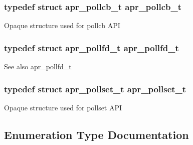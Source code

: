 \subsubsection[{\texorpdfstring{apr\+\_\+pollcb\+\_\+t}{apr_pollcb_t}}]{\setlength{\rightskip}{0pt plus 5cm}typedef struct {\bf apr\+\_\+pollcb\+\_\+t} {\bf apr\+\_\+pollcb\+\_\+t}}\hypertarget{group__apr__poll_gae382e39bdf0c5a02fca7da3944bece08}{}\label{group__apr__poll_gae382e39bdf0c5a02fca7da3944bece08}
Opaque structure used for pollcb A\+PI 
\subsubsection[{\texorpdfstring{apr\+\_\+pollfd\+\_\+t}{apr_pollfd_t}}]{\setlength{\rightskip}{0pt plus 5cm}typedef struct {\bf apr\+\_\+pollfd\+\_\+t} {\bf apr\+\_\+pollfd\+\_\+t}}\hypertarget{group__apr__poll_ga0c89b184cbe2337e44207f1ad245129b}{}\label{group__apr__poll_ga0c89b184cbe2337e44207f1ad245129b}
\begin{DoxySeeAlso}{See also}
\hyperlink{structapr__pollfd__t}{apr\+\_\+pollfd\+\_\+t} 
\end{DoxySeeAlso}
\subsubsection[{\texorpdfstring{apr\+\_\+pollset\+\_\+t}{apr_pollset_t}}]{\setlength{\rightskip}{0pt plus 5cm}typedef struct {\bf apr\+\_\+pollset\+\_\+t} {\bf apr\+\_\+pollset\+\_\+t}}\hypertarget{group__apr__poll_ga680da1f10ac5ef75efc503a9d15b8906}{}\label{group__apr__poll_ga680da1f10ac5ef75efc503a9d15b8906}
Opaque structure used for pollset A\+PI 

\subsection{Enumeration Type Documentation}
